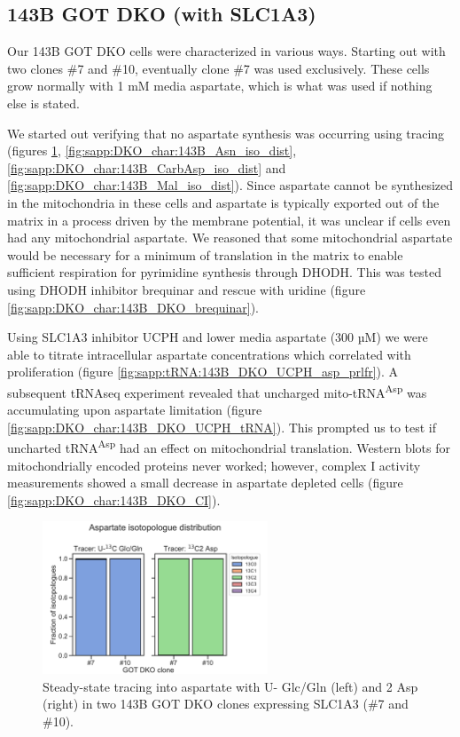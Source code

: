 \subsection{143B GOT DKO (with SLC1A3)}
Our 143B GOT DKO cells were characterized in various ways.
Starting out with two clones \#7 and \#10, eventually clone \#7 was used exclusively.
These cells grow normally with 1 mM media aspartate, which is what was used if nothing else is stated.

We started out verifying that no aspartate synthesis was occurring using \hCi{} tracing (figures \ref{fig:sapp:DKO_char:143B_Asp_iso_dist}, \ref{fig:sapp:DKO_char:143B_Asn_iso_dist}, \ref{fig:sapp:DKO_char:143B_CarbAsp_iso_dist} and \ref{fig:sapp:DKO_char:143B_Mal_iso_dist}).
Since aspartate cannot be synthesized in the mitochondria in these cells and aspartate is typically exported out of the matrix in a process driven by the membrane potential, it was unclear if cells even had any mitochondrial aspartate.
We reasoned that some mitochondrial aspartate would be necessary for a minimum of translation in the matrix to enable sufficient respiration for pyrimidine synthesis through DHODH.
This was tested using DHODH inhibitor brequinar and rescue with uridine (figure \ref{fig:sapp:DKO_char:143B_DKO_brequinar}).

Using SLC1A3 inhibitor UCPH and lower media aspartate (300 µM) we were able to titrate intracellular aspartate concentrations which correlated with proliferation (figure \ref{fig:sapp:tRNA:143B_DKO_UCPH_asp_prlfr}).
A subsequent tRNAseq experiment revealed that uncharged mito-tRNA\textsuperscript{Asp} was accumulating upon aspartate limitation (figure \ref{fig:sapp:DKO_char:143B_DKO_UCPH_tRNA}).
This prompted us to test if uncharted tRNA\textsuperscript{Asp} had an effect on mitochondrial translation.
Western blots for mitochondrially encoded proteins never worked; however, complex I activity measurements showed a small decrease in aspartate depleted cells (figure \ref{fig:sapp:DKO_char:143B_DKO_CI}).



\begin{figure}[ht]
    \centering
    \includegraphics[width=0.6\textwidth]{figures/sapp/DKO_char/143B_Asp_iso_dist.pdf}
    \caption[\hCi{} Gln/Glc, Asp tracing in 143B GOT DKO, Asp.]{
    Steady-state tracing into aspartate with U-\hCi{} Glc/Gln (left) and \hCi{}2 Asp (right) in two 143B GOT DKO clones expressing SLC1A3 (\#7 and \#10).
    }
    \label{fig:sapp:DKO_char:143B_Asp_iso_dist}
\end{figure}

